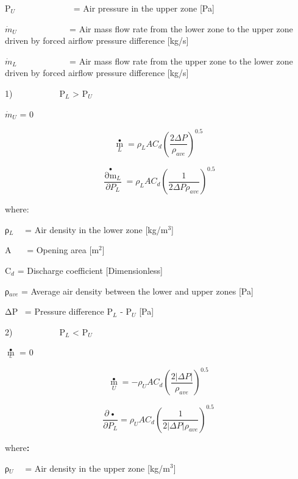 P\(_{U}\)~~~~~~~~~~~~~ = Air pressure in the upper zone {[}Pa{]}

\({\dot m_U}\) ~~~~~~~~~~~ = Air mass flow rate from the lower zone to the upper zone driven by forced airflow pressure difference {[}kg/s{]}

\({\dot m_L}\) ~~~~~~~~~~~ = Air mass flow rate from the upper zone to the lower zone driven by forced airflow pressure difference {[}kg/s{]}

1)~~~~~~~~~~~P\(_{L}\) \textgreater{} P\(_{U}\)

\({\dot m_U}\) = 0

\begin{equation}
{\mathop m\limits^ \bullet_L} = {\rho_L}A{C_d}{\left( {\frac{{2\Delta P}}{{{\rho_{ave}}}}} \right)^{0.5}}
\end{equation}

\begin{equation}
\frac{{{{\mathop {\partial m}\limits^ \bullet  }_L}}}{{\partial {P_L}}} = {\rho_L}A{C_d}{\left( {\frac{1}{{2\Delta P{\rho_{ave}}}}} \right)^{0.5}}
\end{equation}

where:

ρ\(_{L}\)~~ = Air density in the lower zone {[}kg/m\(^{3}\){]}

A~~~ = Opening area {[}m\(^{2}\){]}

C\(_{d}\) = Discharge coefficient {[}Dimensionless{]}

ρ\(_{ave}\) = Average air density between the lower and upper zones {[}Pa{]}

ΔP~ = Pressure difference P\(_{L}\) - P\(_{U}\) {[}Pa{]}

2)~~~~~~~~~~~P\(_{L}\) \textless{} P\(_{U}\)

\({\mathop m\limits^ \bullet_{_L}}\) = 0

\begin{equation}
{\mathop m\limits^ \bullet_U} =  - {\rho_U}A{C_d}{\left( {\frac{{2\left| {\Delta P} \right|}}{{{\rho_{ave}}}}} \right)^{0.5}}
\end{equation}

\begin{equation}
\frac{{\partial \mathop {{m_U}}\limits^ \bullet  }}{{\partial {P_L}}} = {\rho_U}A{C_d}{\left( {\frac{1}{{2\left| {\Delta P} \right|{\rho_{ave}}}}} \right)^{0.5}}
\end{equation}

where\textbf{:}

ρ\(_{U}\)~~ = Air density in the upper zone {[}kg/m\(^{3}\){]}

